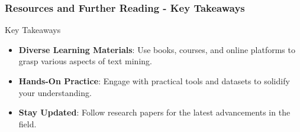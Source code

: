\documentclass[aspectratio=169]{beamer}
\begin{document}
\begin{frame}[fragile]
    \frametitle{Resources and Further Reading - Key Takeaways}
    \begin{block}{Key Takeaways}
        \begin{itemize}
            \item \textbf{Diverse Learning Materials}: Use books, courses, and online platforms to grasp various aspects of text mining.
            \item \textbf{Hands-On Practice}: Engage with practical tools and datasets to solidify your understanding.
            \item \textbf{Stay Updated}: Follow research papers for the latest advancements in the field.
        \end{itemize}
    \end{block}
\end{frame}
\end{document}
